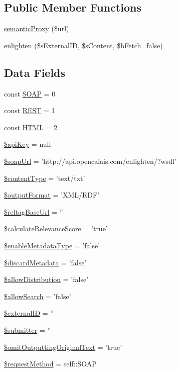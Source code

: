 \subsection*{Public Member Functions}
\begin{DoxyCompactItemize}
\item 
\hyperlink{classCPSOpenCalais_ac0b3a7b2ac4ed8f5d6b100820faedfab}{semanticProxy} (\$url)
\item 
\hyperlink{classCPSOpenCalais_a816ea4fdb9191868f2d0f51d182114bd}{enlighten} (\$sExternalID, \$sContent, \$bFetch=false)
\end{DoxyCompactItemize}
\subsection*{Data Fields}
\begin{DoxyCompactItemize}
\item 
const \hyperlink{classCPSOpenCalais_abd77e417d95ee59b739e54a62fe97fbc}{SOAP} = 0
\item 
const \hyperlink{classCPSOpenCalais_a1273e4f6dfecad5cc711360770b7d784}{REST} = 1
\item 
const \hyperlink{classCPSOpenCalais_ac124904e08a9542af2a219df5f9472e6}{HTML} = 2
\item 
\hyperlink{classCPSOpenCalais_a084e3db37d1b117a3cc7212cf2eed533}{\$apiKey} = null
\item 
\hyperlink{classCPSOpenCalais_a07eadf024580d87646e290d38176c8a7}{\$soapUrl} = 'http://api.opencalais.com/enlighten/?wsdl'
\item 
\hyperlink{classCPSOpenCalais_ab8c052d0ddebb9f14151f8682916a587}{\$contentType} = 'text/txt'
\item 
\hyperlink{classCPSOpenCalais_aad6ca9fda50b25879e53039e23613449}{\$outputFormat} = 'XML/RDF'
\item 
\hyperlink{classCPSOpenCalais_a68ec6608c1cf0f23c25f420586e31e77}{\$reltagBaseUrl} = ''
\item 
\hyperlink{classCPSOpenCalais_a32ea2c52cbe7a0febc8be98c7ca57195}{\$calculateRelevanceScore} = 'true'
\item 
\hyperlink{classCPSOpenCalais_a465299fb5bd9cc610d83d8cc162a69ef}{\$enableMetadataType} = 'false'
\item 
\hyperlink{classCPSOpenCalais_a0e3c2633bd75ee4bdb9bc4ad0e498a0c}{\$discardMetadata} = 'false'
\item 
\hyperlink{classCPSOpenCalais_a2989023b45237cd246c557e99bf994b6}{\$allowDistribution} = 'false'
\item 
\hyperlink{classCPSOpenCalais_a128c7ee55d4a7c1aa84c8b65a88d6862}{\$allowSearch} = 'false'
\item 
\hyperlink{classCPSOpenCalais_a03cbdb5a006d142963eb1f513002bdd0}{\$externalID} = ''
\item 
\hyperlink{classCPSOpenCalais_a317ab5774a65de21409c3f9715e5c50c}{\$submitter} = ''
\item 
\hyperlink{classCPSOpenCalais_ad0c769ee6d064c1c2e3e16ee10b3404e}{\$omitOutputtingOriginalText} = 'true'
\item 
\hyperlink{classCPSOpenCalais_a37c866e0dd005b2054896f4c4fb88132}{\$requestMethod} = self::SOAP
\end{DoxyCompactItemize}


